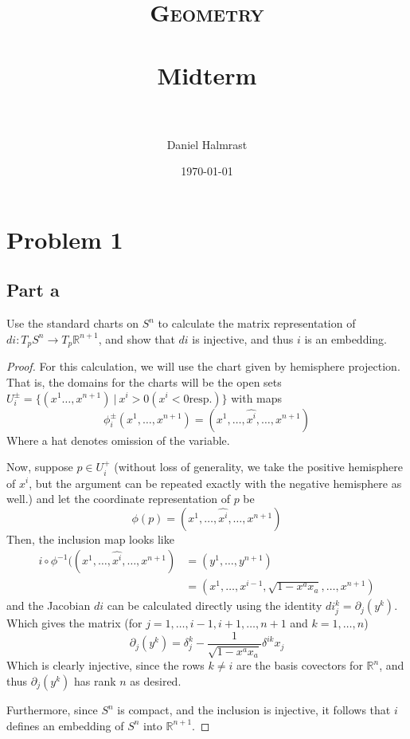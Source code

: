 \documentclass[fontsize=11pt]{scrartcl} %
\title{	
\normalfont \normalsize 
\textsc{Geometry} \\ [25pt] %
\horrule{0.5pt} \\[0.4cm] %
\huge Midterm\\ %
\horrule{2pt} \\[0.5cm] %
}
\author{Daniel Halmrast} %
\date{\normalsize\today} %
\numberwithin{equation}{section} %
\numberwithin{figure}{section} %
\numberwithin{table}{section} %
\newcommand{\R}{\mathbb{R}}
\begin{document}
\maketitle %

\section*{Problem 1}
\subsection*{Part a}
Use the standard charts on $S^n$ to calculate the matrix representation of $di:T_pS^n\to T_p\R^{n+1}$,
and show that $di$ is injective, and thus $i$ is an embedding.
\\
\begin{proof}
For this calculation, we will use the chart given by hemisphere projection. That is, the
domains for the charts will be the open sets $U_i^{\pm}=\{(x^1\ldots,x^{n+1})\ |\ x^i>0 (x^i<0\textrm{resp.})\}$
with maps
\[
\phi_i^{\pm}(x^1,\ldots,x^{n+1}) = (x^1,\ldots,\hat{x^i},\ldots,x^{n+1})
\]
Where a hat denotes omission of the variable.

Now, suppose $p\in U_i^+$ (without loss of generality, we take the positive hemisphere
of $x^i$, but the argument can be repeated exactly with the negative hemisphere as well.)
and let the coordinate representation of $p$ be
\[
\phi(p) = (x^1,\ldots,\hat{x^i},\ldots,x^{n+1})
\]
Then, the inclusion map looks like
\[
\begin{aligned}
i\circ\phi^{-1}((x^1,\ldots,\hat{x^i},\ldots,x^{n+1}) &=(y^1,\ldots,y^{n+1})\\
                        &=(x^1,\ldots,x^{i-1},\sqrt{1-x^ax_a},\ldots,x^{n+1})
\end{aligned}
\]
and the Jacobian $di$ can be calculated directly using the identity $di_j^k=\partial_j(y^k)$.
Which gives the matrix (for $j=1,\ldots,i-1,i+1,\ldots,n+1$ and $k=1,\ldots,n$)
\[
\partial_j(y^k) = \delta_j^k -\frac{1}{\sqrt{1-x^ax_a}}\delta^{ik} x_j
\]
Which is clearly injective, since the rows $k\neq i$ are the basis covectors for $\R^n$, and
thus $\partial_j(y^k)$ has rank $n$ as desired.

Furthermore, since $S^n$ is compact, and the inclusion is injective, it follows that
$i$ defines an embedding of $S^n$ into $\R^{n+1}$.
\end{proof}
\end{document}
